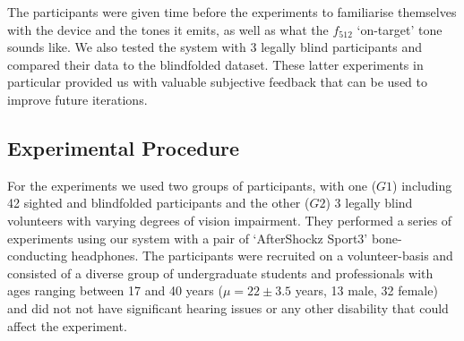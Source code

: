 \documentclass[sigconf, screen=true, anonymous=true]{acmart}
\begin{document}
The participants were given time before the experiments to familiarise themselves with the device and the tones it emits, as well as what the $f_{512}$ `on-target' tone sounds like.
We also tested the system with 3 legally blind participants and compared their data to the blindfolded dataset.
These latter experiments in particular provided us with valuable subjective feedback that can be used to improve future iterations.

\subsection{Experimental Procedure}

For the experiments we used two groups of participants, with one ($G1$) including 42 sighted and blindfolded participants and the other ($G2$) 3 legally blind volunteers with varying degrees of vision impairment. 
They performed a series of experiments using our system with a pair of `AfterShockz Sport3' bone-conducting headphones.
The participants were recruited on a volunteer-basis and consisted of a diverse group of undergraduate students and professionals with ages ranging between 17 and 40 years ($\mu=22\pm3.5$ years, 13 male, 32 female) and did not not have significant hearing issues or any other disability that could affect the experiment.


\end{document}
